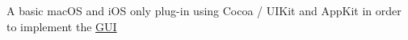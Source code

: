 A basic mac\+OS and i\+OS only plug-\/in using Cocoa / U\+I\+Kit and App\+Kit in order to implement the \mbox{\hyperlink{class_g_u_i}{G\+UI}} 